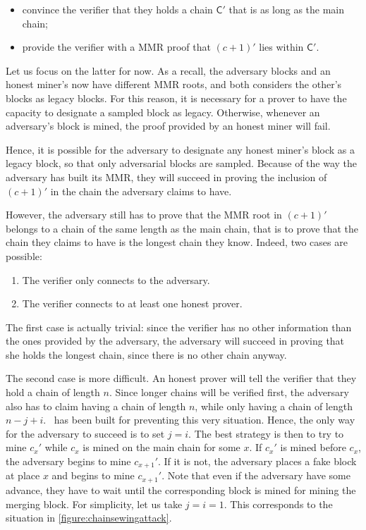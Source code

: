 \documentclass[11pt]{report}
\begin{document}
            \begin{itemize}
                \item convince the verifier that they holds a chain \(\mathsf{C}'\) that is as long as the main chain;
                \item provide the verifier with a MMR proof that \((c+1)'\) lies within \(\mathsf{C}'\).
            \end{itemize}
            
            Let us focus on the latter for now. As a recall, the adversary blocks and an honest miner's now have different MMR roots, and both considers the other's blocks as legacy blocks. For this reason, it is necessary for a prover to have the capacity to designate a sampled block as legacy. Otherwise, whenever an adversary's block is mined, the proof provided by an honest miner will fail.
            
            Hence, it is possible for the adversary to designate any honest miner's block as a legacy block, so that only adversarial blocks are sampled. Because of the way the adversary has built its MMR, they will succeed in proving the inclusion of \((c+1)'\) in the chain the adversary claims to have.
            
            However, the adversary still has to prove that the MMR root in \((c+1)'\) belongs to a chain of the same length as the main chain, that is to prove that the chain they claims to have is the longest chain they know. Indeed, two cases are possible:
            
            \begin{enumerate}
            \item The verifier only connects to the adversary.
            \item The verifier connects to at least one honest prover.
            \end{enumerate}
            
            The first case is actually trivial: since the verifier has no other information than the ones provided by the adversary, the adversary will succeed in proving that she holds the longest chain, since there is no other chain anyway.
            
            The second case is more difficult. An honest prover will tell the verifier that they hold a chain of length \(n\). Since longer chains will be verified first, the adversary also has to claim having a chain of length \(n\), while only having a chain of length \(n-j+i\). \FC\ has been built for preventing this very situation. Hence, the only way for the adversary to succeed is to set \(j=i\). The best strategy is then to try to mine \(c_x'\) while \(c_x\) is mined on the main chain for some \(x\). If \(c_x'\) is mined before \(c_x\), the adversary begins to mine \(c_{x+1}'\). If it is not, the adversary places a fake block at place \(x\) and begins to mine \(c_{x+1}'\). Note that even if the adversary have some advance, they have to wait until the corresponding block is mined for mining the merging block. For simplicity, let us take \(j=i=1\). This corresponds to the situation in \autoref{figure:chainsewingattack}.
            
\end{document}
